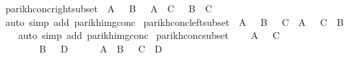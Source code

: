 \begin{isabellebody}
\isadelimproof
\isanewline
%
\endisadelimproof
\isanewline
{}\isamarkupfalse%
\ parikh{\isacharunderscore}{\kern0pt}conc{\isacharunderscore}{\kern0pt}right{\isacharunderscore}{\kern0pt}subset{\isacharcolon}{\kern0pt}\ {\isachardoublequoteopen}{\isasymPsi}\ A\ {\isasymsubseteq}\ {\isasymPsi}\ B\ {\isasymLongrightarrow}\ {\isasymPsi}\ {\isacharparenleft}{\kern0pt}A\ {\isacharat}{\kern0pt}{\isacharat}{\kern0pt}\ C{\isacharparenright}{\kern0pt}\ {\isasymsubseteq}\ {\isasymPsi}\ {\isacharparenleft}{\kern0pt}B\ {\isacharat}{\kern0pt}{\isacharat}{\kern0pt}\ C{\isacharparenright}{\kern0pt}{\isachardoublequoteclose}\isanewline
%
\isadelimproof
\ \ %
\endisadelimproof
%
\isatagproof
{}\isamarkupfalse%
\ {\isacharparenleft}{\kern0pt}auto\ simp\ add{\isacharcolon}{\kern0pt}\ parikh{\isacharunderscore}{\kern0pt}img{\isacharunderscore}{\kern0pt}conc{\isacharparenright}{\kern0pt}%
\endisatagproof
{\isafoldproof}%
%
\isadelimproof
\isanewline
%
\endisadelimproof
\isanewline
{}\isamarkupfalse%
\ parikh{\isacharunderscore}{\kern0pt}conc{\isacharunderscore}{\kern0pt}left{\isacharunderscore}{\kern0pt}subset{\isacharcolon}{\kern0pt}\ {\isachardoublequoteopen}{\isasymPsi}\ A\ {\isasymsubseteq}\ {\isasymPsi}\ B\ {\isasymLongrightarrow}\ {\isasymPsi}\ {\isacharparenleft}{\kern0pt}C\ {\isacharat}{\kern0pt}{\isacharat}{\kern0pt}\ A{\isacharparenright}{\kern0pt}\ {\isasymsubseteq}\ {\isasymPsi}\ {\isacharparenleft}{\kern0pt}C\ {\isacharat}{\kern0pt}{\isacharat}{\kern0pt}\ B{\isacharparenright}{\kern0pt}{\isachardoublequoteclose}\isanewline
%
\isadelimproof
\ \ %
\endisadelimproof
%
\isatagproof
{}\isamarkupfalse%
\ {\isacharparenleft}{\kern0pt}auto\ simp\ add{\isacharcolon}{\kern0pt}\ parikh{\isacharunderscore}{\kern0pt}img{\isacharunderscore}{\kern0pt}conc{\isacharparenright}{\kern0pt}%
\endisatagproof
{\isafoldproof}%
%
\isadelimproof
\isanewline
%
\endisadelimproof
\isanewline
{}\isamarkupfalse%
\ parikh{\isacharunderscore}{\kern0pt}conc{\isacharunderscore}{\kern0pt}subset{\isacharcolon}{\kern0pt}\isanewline
\ \ \ {\isachardoublequoteopen}{\isasymPsi}\ A\ {\isasymsubseteq}\ {\isasymPsi}\ C{\isachardoublequoteclose}\isanewline
\ \ \ \ \ \ \ {\isachardoublequoteopen}{\isasymPsi}\ B\ {\isasymsubseteq}\ {\isasymPsi}\ D{\isachardoublequoteclose}\isanewline
\ \ \ \ \ {\isachardoublequoteopen}{\isasymPsi}\ {\isacharparenleft}{\kern0pt}A\ {\isacharat}{\kern0pt}{\isacharat}{\kern0pt}\ B{\isacharparenright}{\kern0pt}\ {\isasymsubseteq}\ {\isasymPsi}\ {\isacharparenleft}{\kern0pt}C\ {\isacharat}{\kern0pt}{\isacharat}{\kern0pt}\ D{\isacharparenright}{\kern0pt}{\isachardoublequoteclose}\isanewline

\end{isabellebody}
